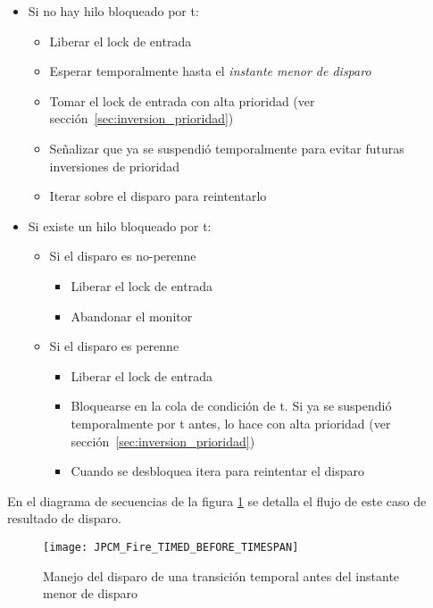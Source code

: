\begin{itemize}
  \item Si no hay hilo bloqueado por t:
      \begin{itemize}
        \item Liberar el lock de entrada
        \item Esperar temporalmente hasta el \textit{instante menor de disparo}
        \item Tomar el lock de entrada con alta prioridad (ver
        sección~\ref{sec:inversion_prioridad})
        \item Señalizar que ya se suspendió temporalmente para evitar futuras
        inversiones de prioridad
        \item Iterar sobre el disparo para reintentarlo
      \end{itemize}
  \item Si existe un hilo bloqueado por t:
      \begin{itemize}
        \item Si el disparo es no-perenne
                \begin{itemize}
                  \item Liberar el lock de entrada
                  \item Abandonar el monitor
                \end{itemize}
        \item Si el disparo es perenne
                \begin{itemize}
                  \item Liberar el lock de entrada
                  \item Bloquearse en la cola de condición de t. Si ya se suspendió
                  temporalmente por t antes, lo hace con alta prioridad (ver
                  sección~\ref{sec:inversion_prioridad})
                  \item Cuando se desbloquea itera para reintentar el disparo
                \end{itemize}
      \end{itemize}
\end{itemize}
En el diagrama de secuencias de la figura
\ref{fig:JPCM_Fire_TIMED_BEFORE_TIMESPAN} se detalla el flujo de este caso de
resultado de disparo.

\begin{figure}[H]
  \centering
  \texttt{[image: JPCM\_Fire\_TIMED\_BEFORE\_TIMESPAN]}
  \caption{Manejo del disparo de una transición temporal antes del instante
  menor de disparo}
  \label{fig:JPCM_Fire_TIMED_BEFORE_TIMESPAN}
\end{figure}

